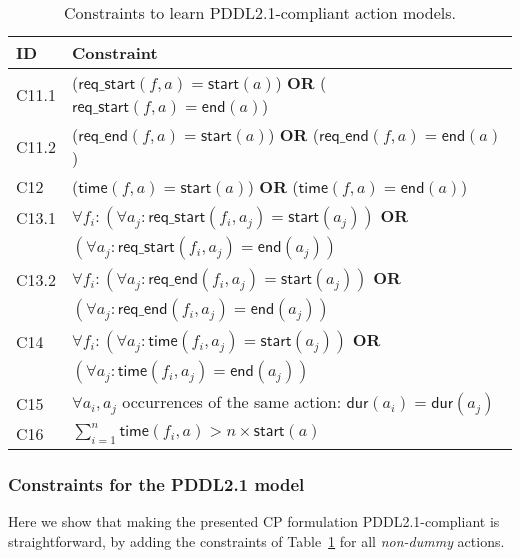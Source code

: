 \documentclass{ecai}
\newcommand{\dur}{\mathsf{dur}}    %
\newcommand{\start}{\mathsf{start}}%
\newcommand{\en}{\mathsf{end}}     %
\newcommand{\tim}{\mathsf{time}}   %
\newcommand{\reqs}{\mathsf{req\_{start}}} %
\newcommand{\reqe}{\mathsf{req\_{end}}}   %
\begin{document}
\begin{table}
\begin{center}   
\caption{Constraints to learn PDDL2.1-compliant action models.}	
\begin{scriptsize}
\begin{tabular}{ll}
\hline	
{\bf ID} &{\bf Constraint} \\ %
\hline
C11.1& ($\reqs(f,a) = \start(a)$) \textbf{OR} ($\reqs(f,a) = \en(a)$) \\%
C11.2& ($\reqe(f,a) = \start(a)$) \textbf{OR} ($\reqe(f,a) = \en(a)$) \\%
C12& ($\tim(f,a) = \start(a)$) \textbf{OR} ($\tim(f,a) = \en(a)$) \\ %
C13.1& $\forall f_i: (\forall a_j: \reqs(f_i,a_j) = \start(a_j))$ \textbf{OR} \\%
&\hspace{1.1cm}$(\forall a_j: \reqs(f_i,a_j) = \en(a_j))$ \\
C13.2& $\forall f_i: (\forall a_j: \reqe(f_i,a_j) = \start(a_j))$ \textbf{OR} \\
&\hspace{1.1cm}$(\forall a_j: \reqe(f_i,a_j) = \en(a_j))$ \\
C14& $\forall f_i: (\forall a_j: \tim(f_i,a_j) = \start(a_j))$ \textbf{OR} \\%
&\hspace{0.9cm}$(\forall a_j: \tim(f_i,a_j) = \en(a_j))$ \\
C15& $\forall a_i,a_j$ occurrences of the same action: $\dur(a_i) = \dur(a_j)$ \\ %
C16 &$\sum_{i=1}^{n} \tim(f_i,a) > n \times \start(a)$ 

\end{tabular}
\end{scriptsize}
\label{table:21constraints}
\end{center}
\end{table}

\subsubsection{Constraints for the PDDL2.1 model}
\label{sec:PDDL21constraints}
Here we show that making the presented CP formulation PDDL2.1-compliant is straightforward, by adding the constraints of Table~\ref{table:21constraints} for all {\em non-dummy} actions.
\end{document}
